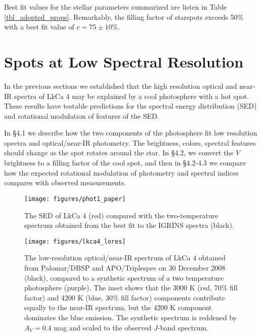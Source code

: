 \documentclass[twocolumn]{emulateapj}%
\begin{document}
Best fit values for the stellar parameters summarized are listen in Table \ref{tbl_adopted_props}.  Remarkably, the filling factor of starspots exceeds 50\% with a best fit value of $c=75\pm 10 \% $.




\section{Spots at Low Spectral Resolution}

In the previous sections we established that the high resolution optical and near-IR spectra of LkCa 4 may be explained by a cool photosphere with a hot spot.  These results have testable predictions for the spectral energy distribution (SED) and rotational modulation of features of the SED.


In \S 4.1 we describe how the two components of the photosphere fit low resolution spectra and optical/near-IR photometry.  The brightness, colors, spectral features should change as the spot rotates around the star.  In \S 4.2, we convert the $V$ brightness to a filling factor of the cool spot, and then in \S 4.2-4.3 we compare how the expected rotational modulation of photometry and spectral indices compares with observed measurements.

\begin{figure}
	\centering
	\texttt{[image: figures/phot1\_paper]}
\caption{The SED of LkCa 4 (red) compared with the two-temperature spectrum obtained from the best fit to the IGRINS spectra (black).}
\label{fig:sed}
\end{figure}


\begin{figure*}
	\centering
	\texttt{[image: figures/lkca4\_lores]}
	\caption{The low-resolution optical/near-IR spectrum of LkCa 4 obtained from Palomar/DBSP and APO/Triplespec on 30 December 2008 (black), compared to a synthetic spectrum of a two temperature photosphere (purple).  The inset shows that the 3000 K (red, 70\% fill factor) and 4200 K (blue, 30\% fill factor) components contribute equally to the near-IR spectrum, but the 4200 K component dominates the blue emission.  The synthetic spectrum is reddened by $A_V=0.4$ mag and scaled to the observed $J$-band spectrum.  }
	\label{fig:lores}
\end{figure*}
\end{document}
